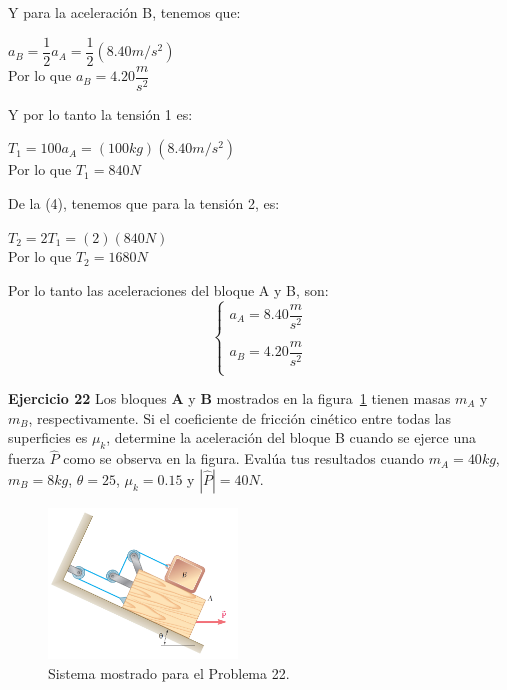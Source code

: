 \documentclass[a4paper,11pt]{scrartcl}
\begin{document}
\begin{center}
\begin{center}
\end{center}
Y para la aceleración B, tenemos que:
\begin{center}
$ a_{B} = \dfrac{1}{2} a_{A} =  \dfrac{1}{2}(8.40 m/s^{2}) $\\
Por lo que $ a_{B}= 4.20  \dfrac{m}{s^{2}}$\\
\end{center}
Y por lo tanto la tensión 1 es:\\
\begin{center}
$  T_{1} = 100a_{A} = (100 kg)(8.40 m/s^{2}) $\\
Por lo que $  T_{1} = 840 N $
\end{center} 
De la (4), tenemos que para la tensión 2, es:\\
\begin{center}
$  T_{2} = 2T_{1} = (2)(840 N) $\\
Por lo que $  T_{2} = 1680 N $\\
\end{center}
Por lo tanto las aceleraciones del bloque A y B, son:\\
\begin{equation}
  \left\lbrace
  \begin{array}{l}
     a_{A}= 8.40  \dfrac{m}{s^{2}}\\
\\
    a_{B}= 4.20  \dfrac{m}{s^{2}}\\
  \end{array}
  \right.
\end{equation}

 
\end{center}

\textbf{Ejercicio 22} Los bloques \textbf{A} y \textbf{B} mostrados en la figura~\ref{fig:22_1} tienen masas $m_A$ y $m_B$, respectivamente. Si el coeficiente de fricción cinético entre todas las superficies es $\mu_k$, determine la aceleración del bloque B cuando se ejerce una fuerza $\hat{P}$ como se observa en la figura. Evalúa tus resultados
cuando $m_A = 40 kg$, $m_B = 8 kg$, $\theta = 25$, $\mu_k = 0.15$ y $|\hat{P}| = 40 N$.\\

\begin{figure}[H]
  \centering
  \includegraphics[height=4cm]{22_1}
  \caption{Sistema mostrado para el Problema 22.}
  \label{fig:22_1}
\end{figure}
\end{document}
